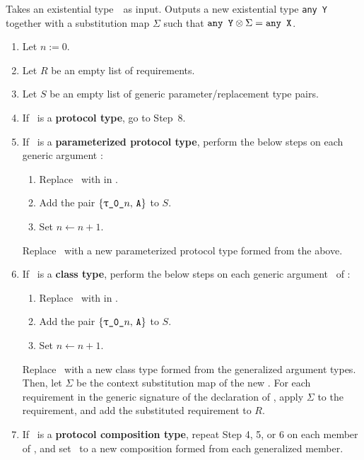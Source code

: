 \documentclass[../generics]{subfiles}
\begin{document}
\begin{algorithm}\label{alg:generalize existential}
Takes an existential type~\AnyX\ as input. Outputs a new existential type \texttt{any Y} together with a substitution map $\Sigma$ such that $\texttt{any~Y} \otimes \Sigma = \texttt{any~X}$.
\begin{enumerate}
\item Let $n := 0$.
\item Let $R$ be an empty list of requirements.
\item Let $S$ be an empty list of generic parameter/replacement type pairs.
\item If \tX\ is a \textbf{protocol type}, go to Step~8.
\item If \tX\ is a \textbf{parameterized protocol type}, perform the below steps on each generic argument \nA:
\begin{enumerate}
\item Replace \nA\ with  in \tX.
\item Add the pair $\{\ttgp{0}{$n$},\, \nA\}$ to $S$.
\item Set $n \leftarrow n + 1$.
\end{enumerate}
Replace \tX\ with a new parameterized protocol type formed from the above.
\item If \tX\ is a \textbf{class type}, perform the below steps on each generic argument \nA\ of \tX:
\begin{enumerate}
\item Replace \nA\ with  in \tX.
\item Add the pair $\{\ttgp{0}{$n$},\, \nA\}$ to $S$.
\item Set $n \leftarrow n + 1$.
\end{enumerate}
Replace \tX\ with a new class type formed from the generalized argument types. Then, let $\Sigma$ be the context substitution map of the new \tX. For each requirement in the generic signature of the declaration of \tX, apply $\Sigma$ to the requirement, and add the substituted requirement to $R$.
\item If \tX\ is a \textbf{protocol composition type}, repeat Step 4, 5, or 6 on each member of \tX, and set \tX\ to a new composition formed from each generalized member.

\end{enumerate}
\end{algorithm}
\end{document}
